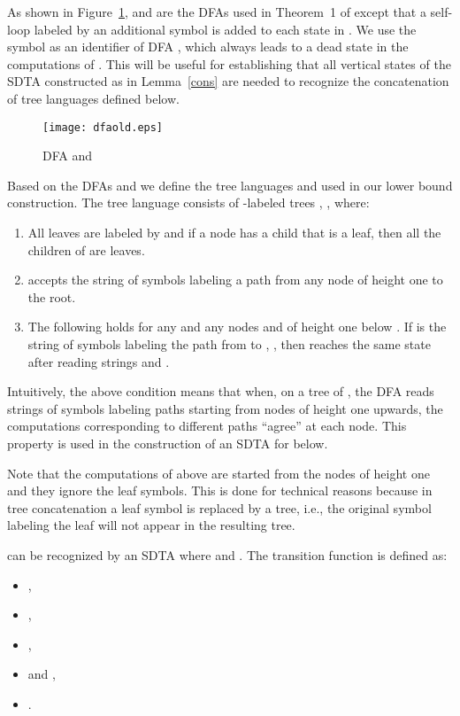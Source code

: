 \documentclass[copyright]{eptcs}
\begin{document}
As shown in
Figure~\ref{f:dfa},  and  are the DFAs used in Theorem~1 of
\cite{YuZhSa94} except that a self-loop labeled by
an additional symbol  is added to
each state in .
We use the symbol  as an identifier of DFA ,
which always leads  to a dead state in the computations of .
This will be useful for establishing that all vertical states
of the SDTA constructed as in Lemma~\ref{cons} are needed
to recognize the concatenation of tree languages defined below.

\begin{figure}
\centering
\texttt{[image: dfaold.eps]}
\caption{DFA  and }\label{f:dfa}
\end{figure}

Based on the DFAs  and  we define the tree languages
 and  used in our lower bound construction.
The tree language  consists of -labeled trees ,
, where:
\begin{enumerate}
\item All leaves are labeled
by  and if a node  has a child that is a leaf, then all the
children of  are leaves.
\item  accepts the string of symbols labeling
a path from any node of height one to the root.
\item The following
holds for any  and any nodes
  and 
 of height one below . If  is the string
of symbols labeling the path from  to , , then
 reaches the same state after reading strings  and .
\end{enumerate}
Intuitively, the above condition means that when, on a tree of
, the DFA  reads strings of symbols labeling paths
starting from nodes of height one upwards, the computations
corresponding to different paths ``agree'' at each node. This
property is used in the construction of an SDTA  for 
below.

Note that the computations of  above are started from the nodes
of height one and they ignore the leaf symbols. This is done for
technical reasons because in tree concatenation a leaf symbol is
replaced by a tree, i.e., the original symbol labeling the leaf
will not appear in the resulting tree.

 can be recognized by an SDTA  where  and .
The transition function is defined as:
\begin{itemize}
  \item[(1)] ,
  \item[(2)] ,
  \item[(3)] ,
  \item[(4)]  and
  ,
  \item[(5)] .
\end{itemize}
\end{document}
